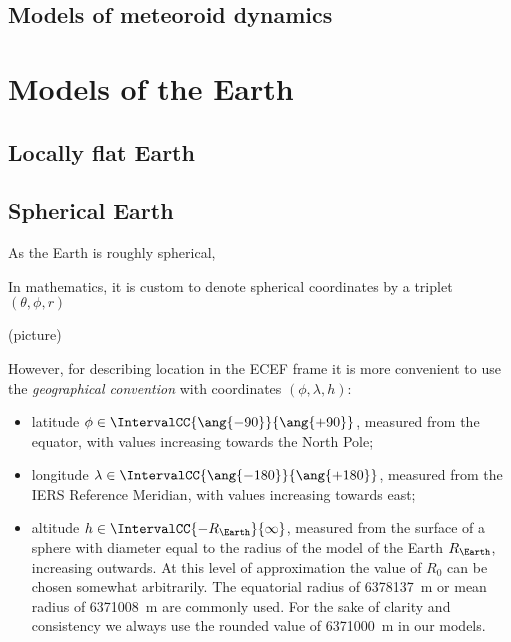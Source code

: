 



\subsection{Models of meteoroid dynamics} \label{mm}





\section{Models of the Earth}


    \subsection{Locally flat Earth} \label{mmf}


    \subsection{Spherical Earth} \label{mms}
        As the Earth is roughly spherical, 

        In mathematics, it is custom to denote spherical coordinates by a triplet
        $(\theta, \phi, r)$

        (picture)

        However, for describing location in the ECEF frame it is more convenient
        to use the \emph{geographical convention} with coordinates $(\phi, \lambda, h)$:
        \begin{itemize}
            \item latitude $\phi \in \IntervalCC{\ang{-90}}{\ang{+90}}$, measured from the equator,
                with values increasing towards the North Pole;
            \item longitude $\lambda \in \IntervalCC{\ang{-180}}{\ang{+180}}$, measured from the IERS Reference Meridian,
                with values increasing towards east;
            \item altitude $h \in \IntervalCC{-R_\Earth}{\infty}$, measured from the surface of
                a sphere with diameter equal to the radius of the model of the Earth $R_\Earth$, increasing outwards.
                At this level of approximation the value of $R_0$ can be chosen somewhat arbitrarily.
                The equatorial radius of \SI{6378137}{\metre} or mean radius of \SI{6371008}{\metre} are commonly used.
                For the sake of clarity and consistency we always use the
                rounded value of \SI{6371000}{\metre} in our models.
        \end{itemize}

